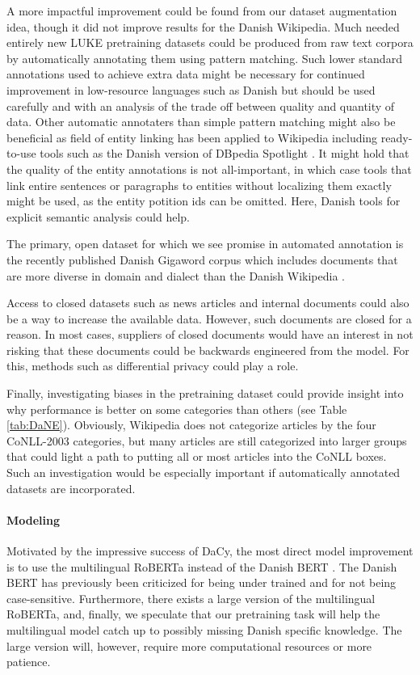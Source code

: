 \documentclass[main.tex]{subfiles}
\begin{document}
A more impactful improvement could be found from our dataset augmentation idea, though it did not improve results for the Danish Wikipedia.
Much needed entirely new LUKE pretraining datasets could be produced from raw text corpora by automatically annotating them using pattern matching.
Such lower standard annotations used to achieve extra data might be necessary for continued improvement in low-resource languages such as Danish but should be used carefully and with an analysis of the trade off between quality and quantity of data.
Other automatic annotaters than simple pattern matching might also be beneficial as field of entity linking has been applied to Wikipedia \cite{brochier2021wikilink} including ready-to-use tools such as the Danish version of DBpedia Spotlight \cite{isem2013daiber}.
It might hold that the quality of the entity annotations is not all-important, in which case tools that link entire sentences or paragraphs to entities without localizing them exactly might be used, as the entity potition ids can be omitted.
Here, Danish tools for explicit semantic analysis \cite{hansen2017esa} could help.

The primary, open dataset for which we see promise in automated annotation is the recently published Danish Gigaword corpus which includes documents that are more diverse in domain and dialect than the Danish Wikipedia \cite{derc2021giga}.

Access to closed datasets such as news articles and internal documents could also be a way to increase the available data.
However, such documents are closed for a reason.
In most cases, suppliers of closed documents would have an interest in not risking that these documents could be backwards engineered from the model.
For this, methods such as differential privacy \cite{GONG2020131} could play a role.

Finally, investigating biases in the pretraining dataset could provide insight into why performance is better on some categories than others (see Table \ref{tab:DaNE}).
Obviously, Wikipedia does not categorize articles by the four CoNLL-2003 categories, but many articles are still categorized into larger groups that could light a path to putting all or most articles into the CoNLL boxes.
Such an investigation would be especially important if automatically annotated datasets are incorporated.

\paragraph{Modeling}
Motivated by the impressive success of DaCy, the most direct model improvement is to use the multilingual RoBERTa \cite{conneau2020unsupervised} instead of the Danish BERT \cite{botxo2019dabert}.
The Danish BERT has previously been criticized for being under trained \cite{derc2021giga, nielsen2020textsum} and for not being case-sensitive.
Furthermore, there exists a large version of the multilingual RoBERTa, and, finally, we speculate that our pretraining task will help the multilingual model catch up to possibly missing Danish specific knowledge.
The large version will, however, require more computational resources or more patience.
\end{document}
